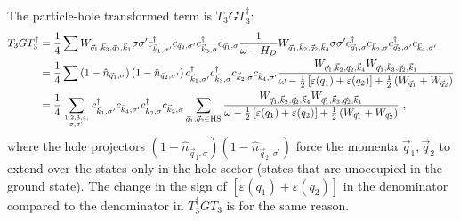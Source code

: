 \documentclass{revtex4-2}
\begin{document}
The particle-hole transformed term is \(T_3 G T_3^\dagger\):
\begin{equation}\begin{aligned}
	T_3 G T_3^\dagger &= \frac{1}{4}\sum  W_{\vec q_1,\vec k_3, \vec q_2, \vec k_1} \sigma\sigma^\prime c^\dagger_{\vec k_1,\sigma^\prime} c_{\vec q_2,\sigma^\prime} c^\dagger_{\vec k_3,\sigma} c_{\vec q_1,\sigma}\frac{1}{\omega - H_D}W_{\vec q_1,\vec k_2, \vec q_2, \vec k_4} \sigma\sigma^\prime c^\dagger_{\vec q_1,\sigma}c_{\vec k_2,\sigma}c^\dagger_{\vec q_2,\sigma^\prime}c_{\vec k_4,\sigma^\prime} \\
			  &= \frac{1}{4}\sum \left(1 - \hat n_{\vec q_1,\sigma}\right) \left(1 - \hat n_{\vec q_2,\sigma^\prime}\right) c^\dagger_{\vec k_1,\sigma^\prime} c^\dagger_{\vec k_3,\sigma}  c_{\vec k_2,\sigma} c_{\vec k_4,\sigma^\prime}\frac{W_{\vec q_1,\vec k_2, \vec q_2, \vec k_4} W_{\vec q_1,\vec k_3, \vec q_2, \vec k_1}}{\omega - \frac{1}{2}\left[\varepsilon(q_1) + \varepsilon(q_2)\right] + \frac{1}{2}\left(W_{\vec q_1} + W_{\vec q_2}\right)}\\
			  &= \frac{1}{4}\sum_{1,2,3,4,\atop{\sigma,\sigma^\prime}} c^\dagger_{\vec k_1,\sigma^\prime}  c_{\vec k_4,\sigma^\prime} c^\dagger_{\vec k_3,\sigma}  c_{\vec k_2,\sigma} \sum_{\vec q_1, \vec q_2 \in \text{HS}}\frac{W_{\vec q_1,\vec k_2, \vec q_2, \vec k_4} W_{\vec q_1,\vec k_3, \vec q_2, \vec k_1}}{\omega - \frac{1}{2}\left[\varepsilon(q_1) + \varepsilon(q_2)\right] + \frac{1}{2}\left(W_{\vec q_1} + W_{\vec q_2}\right)}~,
\end{aligned}\end{equation}
where the hole projectors \(\left(1 - \hat n_{\vec q_1,\sigma}\right) \left(1 - \hat n_{\vec q_2,\sigma^\prime}\right)\) force the momenta \(\vec q_1,\vec q_2\) to extend over the states only in the hole sector (states that are unoccupied in the ground state). The change in the sign of \(\left[\varepsilon(q_1) + \varepsilon(q_2)\right]\) in the denominator compared to the denominator in \(T_3^\dagger G T_3\) is for the same reason.
\end{document}
